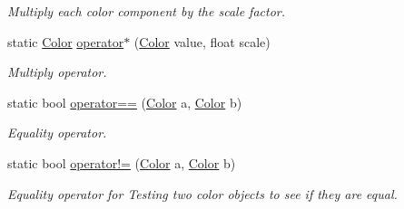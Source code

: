 \begin{DoxyCompactItemize}
\begin{DoxyCompactList}\small\item\em Multiply each color component by the scale factor.\end{DoxyCompactList}\item 
static \hyperlink{struct_microsoft_1_1_xna_1_1_framework_1_1_color}{Color} \hyperlink{struct_microsoft_1_1_xna_1_1_framework_1_1_color_a60f57237b8a355251a30078e9a35ce9a}{operator$\ast$} (\hyperlink{struct_microsoft_1_1_xna_1_1_framework_1_1_color}{Color} value, float scale)
\begin{DoxyCompactList}\small\item\em Multiply operator.\end{DoxyCompactList}\item 
static bool \hyperlink{struct_microsoft_1_1_xna_1_1_framework_1_1_color_adc41d2a4b4b2c24cfaf4b179cc90cd16}{operator==} (\hyperlink{struct_microsoft_1_1_xna_1_1_framework_1_1_color}{Color} a, \hyperlink{struct_microsoft_1_1_xna_1_1_framework_1_1_color}{Color} b)
\begin{DoxyCompactList}\small\item\em Equality operator.\end{DoxyCompactList}\item 
static bool \hyperlink{struct_microsoft_1_1_xna_1_1_framework_1_1_color_a357360ebed9921757855c10397ebb830}{operator!=} (\hyperlink{struct_microsoft_1_1_xna_1_1_framework_1_1_color}{Color} a, \hyperlink{struct_microsoft_1_1_xna_1_1_framework_1_1_color}{Color} b)
\begin{DoxyCompactList}\small\item\em Equality operator for Testing two color objects to see if they are equal.\end{DoxyCompactList}\end{DoxyCompactItemize}

